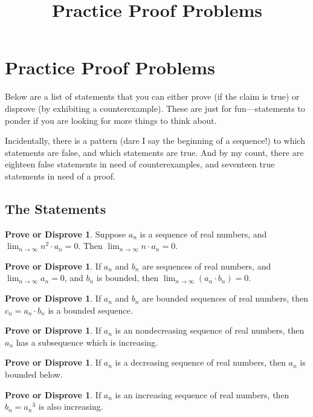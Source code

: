 \documentclass[12pt]{article}
\title{Practice Proof Problems}
\theoremstyle{definition}
\newtheorem{podsip}[theorem]{Prove or Disprove}
\newcommand{\limn}{\displaystyle\lim_{n \to \infty}}
\begin{document}
\section*{Practice Proof Problems}

Below are a list of statements that you can either prove (if the claim
is true) or disprove (by exhibiting a counterexample).  These are just
for fun---statements to ponder if you are looking for more things to think
about.

Incidentally, there is a pattern (dare I say the beginning of a
sequence!) to which statements are false, and which statements are
true.  And by my count, there are eighteen false statements in need of
counterexamples, and seventeen true statements in need of a proof.

\subsection*{The Statements}

\begin{podsip} %
Suppose $a_n$ is a sequence of real numbers, and $\limn n^2 \cdot a_n = 0$.  Then $\limn n \cdot a_n = 0$.
\end{podsip}

\begin{podsip} %
If $a_n$ and $b_n$ are sequences of real numbers, and $\limn a_n = 0$, and $b_n$ is bounded, then $\limn (a_n \cdot b_n) = 0$.
\end{podsip}

\begin{podsip} %
If $a_n$ and $b_n$ are bounded sequences of real numbers, then $c_n = a_n \cdot b_n$ is a bounded sequence.
\end{podsip}

\begin{podsip} %
If $a_n$ is an nondecreasing sequence of real numbers, then $a_n$ has a subsequence which is increasing.
\end{podsip}

\begin{podsip} %
If $a_n$ is a decreasing sequence of real numbers, then $a_n$ is bounded below.
\end{podsip}

\begin{podsip} %
If $a_n$ is an increasing sequence of real numbers, then $b_n = {a_n}^3$ is also increasing.
\end{podsip}
\end{document}
